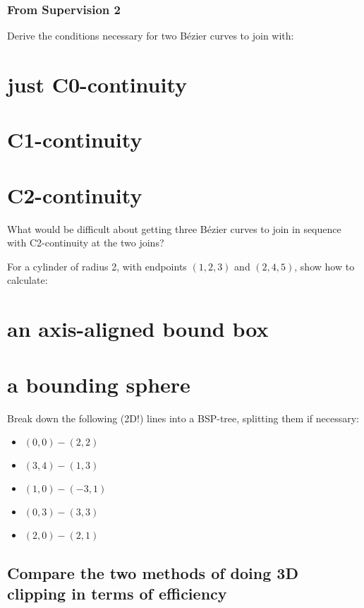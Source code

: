 \documentclass{supervision}
\begin{document}
\section*{From Supervision 2}
\begin{questions}
    \question
    Derive the conditions necessary for two Bézier curves to join with:
    \begin{parts}
        \part{just C0-continuity}
        \part{C1-continuity}
        \part{C2-continuity}
    \end{parts}

    \question
    What would be difficult about getting three Bézier curves to join in sequence with C2-continuity at the two joins?

    \question
    For a cylinder of radius 2, with endpoints $(1,2,3)$ and $(2,4,5)$, show how to calculate:
    \begin{parts}
        \part{an axis-aligned bound box}
        \part{a bounding sphere}
    \end{parts}

    \question
    Break down the following (2D!) lines into a BSP-tree, splitting them if necessary:
    \begin{itemize}
        \item{$(0,0)-(2,2)$}
        \item{$(3,4)-(1,3)$}
        \item{$(1,0)-(-3,1)$}
        \item{$(0,3)-(3,3)$}
        \item{$(2,0)-(2,1)$}
    \end{itemize}

    \question
    \begin{parts}
        \part{Compare the two methods of doing 3D clipping in terms of efficiency}

\end{parts}
\end{questions}
\end{document}
